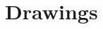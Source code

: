 \documentclass[main.tex]{subfiles}
\begin{document}
\chapter{Drawings} 

%          
%        		
%
%                
%      
%    		
%    		
\end{document}
